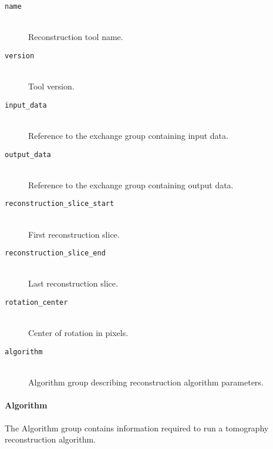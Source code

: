 \begin{description}

\item[\tt{name}] \hfill \\
{Reconstruction tool name.}

\item[\tt{version}] \hfill \\
{Tool version.}

\item[\tt{input\_data}] \hfill \\
{Reference to the exchange group containing input data.}

\item[\tt{output\_data}] \hfill \\
{Reference to the exchange group containing output data.}

\item[\tt{reconstruction\_slice\_start}] \hfill \\
{First reconstruction slice.}

\item[\tt{reconstruction\_slice\_end}] \hfill \\
{Last reconstruction slice.}

\item[\tt{rotation\_center}] \hfill \\
{Center of rotation in pixels.}

\item[\tt{algorithm}] \hfill \\
{Algorithm group describing reconstruction algorithm parameters.}
\end{description}


\paragraph{Algorithm}
\label{section:algorithm}

The Algorithm group contains information required to run a tomography reconstruction algorithm.

